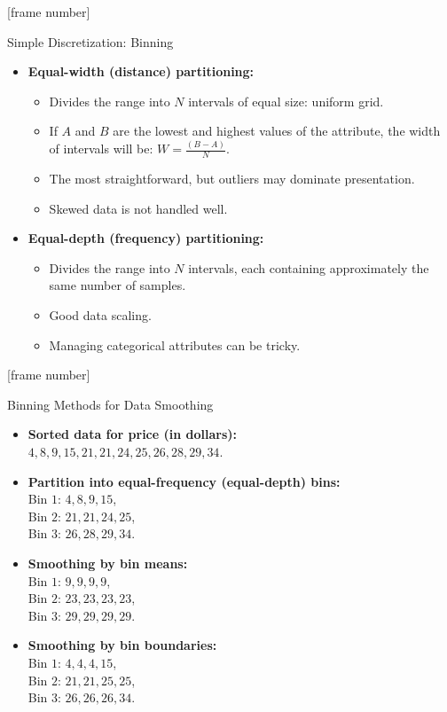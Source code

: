 \documentclass[aspectratio=169,t]{beamer}
\begin{document}
  {
    [frame number]
    \begin{frame}{Simple Discretization: Binning}
    \begin{itemize}
      \item \textbf{Equal-width (distance) partitioning:}
      \begin{itemize}
        \item Divides the range into $N$ intervals of equal size: uniform grid.
        \item If $A$ and $B$ are the lowest and highest values of the attribute, the width of intervals will be: $W = \frac{(B - A)}{N}$.
        \item The most straightforward, but outliers may dominate presentation.
        \item Skewed data is not handled well.
      \end{itemize}
      \item \textbf{Equal-depth (frequency) partitioning:}
      \begin{itemize}
        \item Divides the range into $N$ intervals, each containing approximately the same number of samples.
        \item Good data scaling.
        \item Managing categorical attributes can be tricky.
      \end{itemize}
    \end{itemize}
    \end{frame}
  }

  {
    [frame number]
    \begin{frame}{Binning Methods for Data Smoothing}
    \begin{itemize}
      \item \textbf{Sorted data for price (in dollars):} \\
            $4, 8, 9, 15, 21, 21, 24, 25, 26, 28, 29, 34$.
      \item \textbf{Partition into equal-frequency (equal-depth) bins:}\\
            Bin $1$: $4, 8, 9, 15$,\\
            Bin $2$: $21, 21, 24, 25$,\\
            Bin $3$: $26, 28, 29, 34$.
      \item \textbf{Smoothing by bin means:}\\
            Bin $1$: $9, 9, 9, 9$,\\
            Bin $2$: $23, 23, 23, 23$,\\
            Bin $3$: $29, 29, 29, 29$.\\
      \item \textbf{Smoothing by bin boundaries:}\\
            Bin $1$: $4, 4, 4, 15$,\\
            Bin $2$: $21, 21, 25, 25$,\\
            Bin $3$: $26, 26, 26, 34$.\\
    \end{itemize}
    \end{frame}
  }
\end{document}
